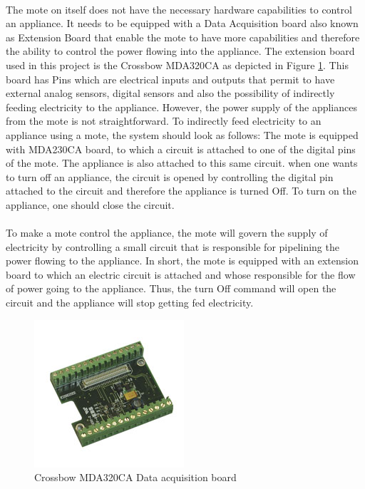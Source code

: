 \documentclass[12pt,a4paper,final]{report}
\begin{document}
\paragraph{}
The mote on itself does not have the necessary hardware capabilities to control an appliance. It needs to be equipped with a Data Acquisition board also known as Extension Board that enable the mote to have more capabilities and therefore the ability to control the power flowing into the appliance. The extension board used in this project is the Crossbow MDA320CA as depicted in Figure \ref{fig:mda320ca}. This board has Pins which are electrical inputs and outputs that permit to have external analog sensors, digital sensors and also the possibility of indirectly feeding electricity to the appliance. However, the power supply of the appliances from the mote is not straightforward. To indirectly feed electricity to an appliance using a mote, the system should look as follows: The mote is equipped with MDA230CA board, to which a circuit is attached to one of the digital pins of the mote. The appliance is also attached to this same circuit. when one wants to turn off an appliance, the circuit is opened by controlling the digital pin attached to the circuit and therefore the appliance is turned Off. To turn on the appliance, one should close the circuit.
\paragraph{}
To make a mote control the appliance, the mote will govern the supply of electricity by controlling a small circuit that is responsible for pipelining the power flowing to the appliance. In short, the mote is equipped with an extension board to which an electric circuit is attached and whose responsible for the flow of power going to the appliance. Thus, the turn Off command will open the circuit and the appliance will stop getting fed electricity.

\begin{figure}[htbp]
\centering
\includegraphics[scale=0.8]{img/mda320.jpg}
\caption{Crossbow MDA320CA Data acquisition board}
\label{fig:mda320ca}
\end{figure}
\end{document}
